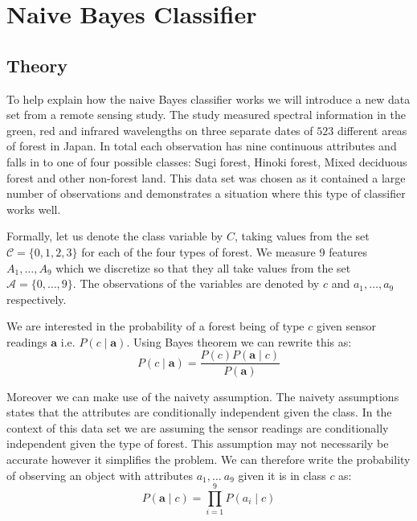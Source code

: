 \chapter{Naive Bayes Classifier}

\section{Theory}

To help explain how the naive Bayes classifier works we will introduce a new data set from a remote sensing study.
The study measured spectral information in the green, red and infrared wavelengths on three separate dates of $523$ different areas of forest in Japan.
In total each observation has nine continuous attributes and falls in to one of four possible classes: Sugi forest, Hinoki forest, Mixed deciduous forest and other non-forest land.
This data set was chosen as it contained a large number of observations and demonstrates a situation where this type of classifier works well.

Formally, let us denote the class variable by $C$, taking values from the set $\mathcal{C} = \{0,1,2,3\}$ for each of the four types of forest.
We measure 9 features $A_1,\dots,A_9$ which we discretize so that they all take values from the set $\mathcal{A} = \{0,\dots,9\}$.
The observations of the variables are denoted by $c$ and $a_1,\dots,a_9$ respectively.

We are interested in the probability of a forest being of type $c$ given sensor readings $\mathbf{a}$ i.e. $P(c \mid \mathbf{a})$.
Using Bayes theorem we can rewrite this as:
\begin{equation} \label{bayes}
	P(c \mid \mathbf{a}) = \frac{P(c)P(\mathbf{a} \mid c)}{P(\mathbf{a})}
\end{equation}

Moreover we can make use of the naivety assumption.
The naivety assumptions states that the attributes are conditionally independent given the class.
In the context of this data set we are assuming the sensor readings are conditionally independent given the type of forest.
This assumption may not necessarily be accurate however it simplifies the problem.
We can therefore write the probability of observing an object with attributes $a_1, \dots\ a_9$ given it is in class $c$ as:
\begin{equation} \label{naivety}
	P(\mathbf{a} \mid c) = \prod_{i=1}^9 P(a_i \mid c)
\end{equation}

